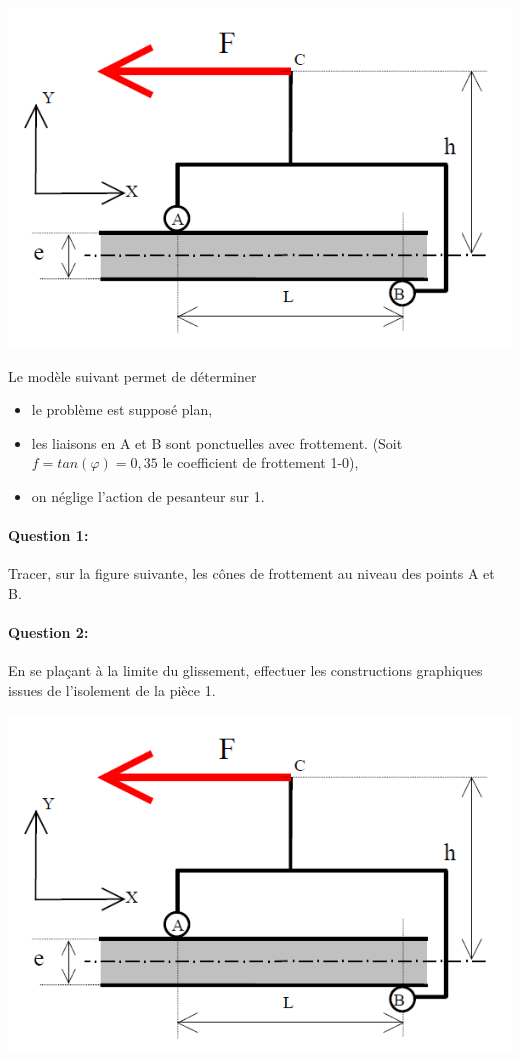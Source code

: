 \begin{minipage}{0.4\linewidth}
   \centering\includegraphics[width=\linewidth]{img/cordeuse_cin.png}
 \end{minipage}
 \hfill
  \begin{minipage}{0.58\linewidth}
Le modèle suivant permet de déterminer
 \begin{itemize}
  \item le problème est supposé plan,
  \item les liaisons en A et B sont ponctuelles avec frottement. (Soit $f=tan(\varphi)=0,35$ le coefficient de frottement 1-0),
  \item on néglige l'action de pesanteur sur 1.
 \end{itemize}
  \end{minipage}

\paragraph{Question 1:} Tracer, sur la figure suivante, les cônes de frottement au niveau des points A et B.

\paragraph{Question 2:} En se plaçant à la limite du glissement, effectuer les constructions graphiques issues de l'isolement de la pièce 1.

\newpage

\begin{center}
	\includegraphics[width=0.8	\linewidth]{img/cordeuse_cin.png}
\end{center}

